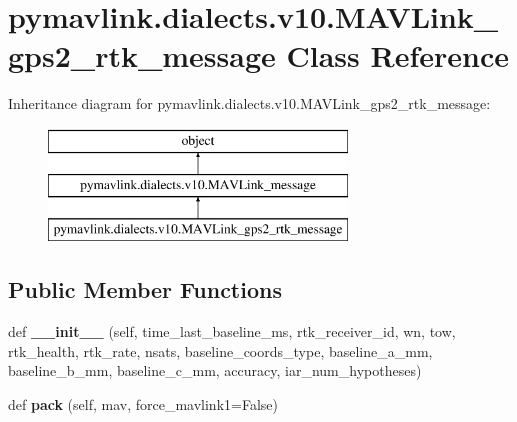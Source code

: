 \hypertarget{classpymavlink_1_1dialects_1_1v10_1_1MAVLink__gps2__rtk__message}{}\section{pymavlink.\+dialects.\+v10.\+M\+A\+V\+Link\+\_\+gps2\+\_\+rtk\+\_\+message Class Reference}
\label{classpymavlink_1_1dialects_1_1v10_1_1MAVLink__gps2__rtk__message}
Inheritance diagram for pymavlink.\+dialects.\+v10.\+M\+A\+V\+Link\+\_\+gps2\+\_\+rtk\+\_\+message\+:\begin{figure}[H]
\begin{center}
\leavevmode
\includegraphics[height=3.000000cm]{classpymavlink_1_1dialects_1_1v10_1_1MAVLink__gps2__rtk__message}
\end{center}
\end{figure}
\subsection*{Public Member Functions}
\begin{DoxyCompactItemize}
\item 
\mbox{\label{classpymavlink_1_1dialects_1_1v10_1_1MAVLink__gps2__rtk__message_a5446771b1bbaf4f8e49ce82d33fd7492}} 
def {\bfseries \+\_\+\+\_\+init\+\_\+\+\_\+} (self, time\+\_\+last\+\_\+baseline\+\_\+ms, rtk\+\_\+receiver\+\_\+id, wn, tow, rtk\+\_\+health, rtk\+\_\+rate, nsats, baseline\+\_\+coords\+\_\+type, baseline\+\_\+a\+\_\+mm, baseline\+\_\+b\+\_\+mm, baseline\+\_\+c\+\_\+mm, accuracy, iar\+\_\+num\+\_\+hypotheses)
\item 
\mbox{\label{classpymavlink_1_1dialects_1_1v10_1_1MAVLink__gps2__rtk__message_a58f11b0c595969068f78069146a99f34}} 
def {\bfseries pack} (self, mav, force\+\_\+mavlink1=False)
\end{DoxyCompactItemize}
